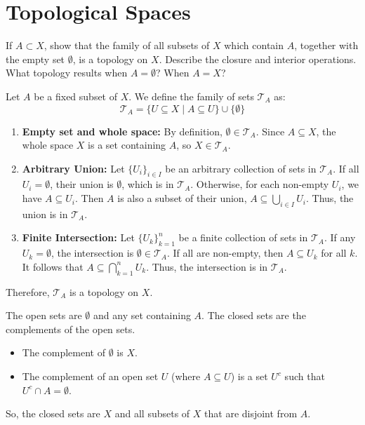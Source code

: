 \section{Topological Spaces}

\begin{problem}
  If $A \subset X$, show that the family of all subsets of $X$ which contain $A$, together with the empty set $\emptyset$, is a topology on $X$. Describe the closure and interior operations. What topology results when $A = \emptyset$? When $A = X$?
\end{problem}

\begin{solution}
  Let $A$ be a fixed subset of $X$. We define the family of sets $\mathcal{T}_A$ as:
  \[ \mathcal{T}_A = \{U \subseteq X \mid A \subseteq U\} \cup \{\emptyset\} \]

  \begin{enumerate}
    \item \textbf{Empty set and whole space:} By definition, $\emptyset \in \mathcal{T}_A$. Since $A \subseteq X$, the whole space $X$ is a set containing $A$, so $X \in \mathcal{T}_A$.

    \item \textbf{Arbitrary Union:} Let $\{U_i\}_{i \in I}$ be an arbitrary collection of sets in $\mathcal{T}_A$. If all $U_i = \emptyset$, their union is $\emptyset$, which is in $\mathcal{T}_A$. Otherwise, for each non-empty $U_i$, we have $A \subseteq U_i$. Then $A$ is also a subset of their union, $A \subseteq \bigcup_{i \in I} U_i$. Thus, the union is in $\mathcal{T}_A$.

    \item \textbf{Finite Intersection:} Let $\{U_k\}_{k=1}^n$ be a finite collection of sets in $\mathcal{T}_A$. If any $U_k = \emptyset$, the intersection is $\emptyset \in \mathcal{T}_A$. If all are non-empty, then $A \subseteq U_k$ for all $k$. It follows that $A \subseteq \bigcap_{k=1}^n U_k$. Thus, the intersection is in $\mathcal{T}_A$.
  \end{enumerate}
  Therefore, $\mathcal{T}_A$ is a topology on $X$.

  The open sets are $\emptyset$ and any set containing $A$. The closed sets are the complements of the open sets.
  \begin{itemize}
    \item The complement of $\emptyset$ is $X$.
    \item The complement of an open set $U$ (where $A \subseteq U$) is a set $U^c$ such that $U^c \cap A = \emptyset$.
  \end{itemize}
  So, the closed sets are $X$ and all subsets of $X$ that are disjoint from $A$.


\end{solution}
